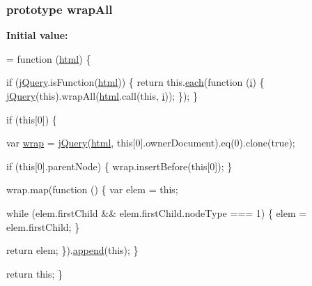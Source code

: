\subsubsection[{\texorpdfstring{wrap\+All}{wrapAll}}]{ {\bf prototype} wrap\+All}\hypertarget{jquery-2_82_81-vsdoc_8js_a2c353bb2917de8da2978e4b4dd73acb3}{}\label{jquery-2_82_81-vsdoc_8js_a2c353bb2917de8da2978e4b4dd73acb3}
{\bfseries Initial value\+:}
\begin{DoxyCode}
= \textcolor{keyword}{function} (\hyperlink{jquery-2_82_81-vsdoc_8js_a54a716632718016dd4e400e83a0970e2}{html}) \{
        

        \textcolor{keywordflow}{if} (\hyperlink{jquery-2_82_81-vsdoc_8js_add5237586d970a38a81f990e8eb28c6c}{jQuery}.isFunction(\hyperlink{jquery-2_82_81-vsdoc_8js_a54a716632718016dd4e400e83a0970e2}{html})) \{
            \textcolor{keywordflow}{return} this.\hyperlink{jquery-2_82_81-vsdoc_8js_a77da68323b96573f900f8b5dd3a47954}{each}(\textcolor{keyword}{function} (\hyperlink{geolocation-marker_8js_a0325b7ce0988782a8032e720ef3aa411}{i}) \{
                \hyperlink{jquery-2_82_81-vsdoc_8js_add5237586d970a38a81f990e8eb28c6c}{jQuery}(\textcolor{keyword}{this}).wrapAll(\hyperlink{jquery-2_82_81-vsdoc_8js_a54a716632718016dd4e400e83a0970e2}{html}.call(\textcolor{keyword}{this}, \hyperlink{geolocation-marker_8js_a0325b7ce0988782a8032e720ef3aa411}{i}));
            \});
        \}

        \textcolor{keywordflow}{if} (\textcolor{keyword}{this}[0]) \{
            
            var \hyperlink{jquery-2_82_81-vsdoc_8js_a75991b1c3d71522ced1bf65ab3b07902}{wrap} = \hyperlink{jquery-2_82_81-vsdoc_8js_add5237586d970a38a81f990e8eb28c6c}{jQuery}(\hyperlink{jquery-2_82_81-vsdoc_8js_a54a716632718016dd4e400e83a0970e2}{html}, \textcolor{keyword}{this}[0].ownerDocument).eq(0).clone(\textcolor{keyword}{true});

            \textcolor{keywordflow}{if} (\textcolor{keyword}{this}[0].parentNode) \{
                wrap.insertBefore(\textcolor{keyword}{this}[0]);
            \}

            wrap.map(\textcolor{keyword}{function} () \{
                var elem = \textcolor{keyword}{this};

                \textcolor{keywordflow}{while} (elem.firstChild && elem.firstChild.nodeType === 1) \{
                    elem = elem.firstChild;
                \}

                \textcolor{keywordflow}{return} elem;
            \}).\hyperlink{jquery-2_82_81-vsdoc_8js_a6b9ad5e0cf5c7480e9a327c771349a90}{append}(\textcolor{keyword}{this});
        \}

        \textcolor{keywordflow}{return} \textcolor{keyword}{this};
    \}
\end{DoxyCode}
